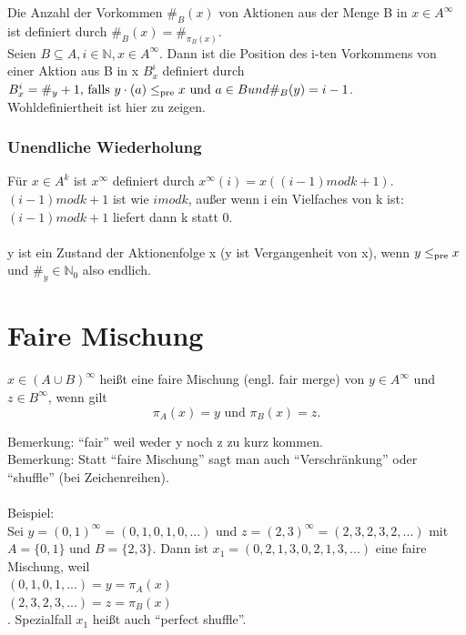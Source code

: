 Die Anzahl der Vorkommen $\#_B(x)$ von Aktionen aus der Menge B in $x \in A^{\infty}$ ist definiert durch $\#_B(x) = \#_{\pi_B(x)}$.
\\
Seien $B \subseteq A, i \in \mathbb{N}, x \in A^{\infty}$. Dann ist die Position des i-ten Vorkommens von einer Aktion aus B in x \emph{$B^i_x$} definiert durch $B^i_x = \#_y + 1 \text{, falls } y \cdot (a) \leq_{\operatorname{pre}} x \text{ und } a \in B und \#_B(y) = i - 1$.\\
Wohldefiniertheit ist hier zu zeigen.\\

\subsubsection*{Unendliche Wiederholung}
Für $x \in A^k$ ist \emph{$x^{\infty}$} definiert durch $x^{\infty}(i) = x((i - 1) mod k + 1)$.\\
$(i - 1) mod k + 1$ ist wie $i mod k$, außer wenn i ein Vielfaches von k ist:\\
$(i - 1) mod k + 1$ liefert dann k statt 0.\\
\\
y ist ein Zustand der Aktionenfolge x (y ist Vergangenheit von x), wenn $y \leq_{\operatorname{pre}} x$ und $\#_y \in \mathbb{N}_0$ also endlich.

\section{Faire Mischung}
$x \in (A \cup B)^\infty$ heißt eine faire Mischung (engl. fair merge) von $y \in A^\infty$ und $z \in B^\infty$, wenn gilt
\begin{equation*}
\pi_A(x) = y \text{ und } \pi_B(x) = z.
\end{equation*}

Bemerkung: "`fair"' weil weder y noch z zu kurz kommen.\\
Bemerkung: Statt "`faire Mischung"' sagt man auch "`Verschränkung"' oder "`shuffle"' (bei Zeichenreihen).\\
\\
Beispiel:\\
Sei $y = (0, 1)^\infty = (0, 1, 0, 1, 0, ...)$ und $z = (2,3)^\infty = (2, 3, 2, 3, 2, ...)$ mit $A = \{0, 1\}$ und $B = \{2, 3\}$. Dann ist $x_1 = (0, 2, 1, 3, 0, 2, 1, 3, ...)$ eine faire Mischung, weil \\
$(0,  1,  0,  1, ...) = y = \pi_A(x)$\\
$(2, 3, 2, 3, ...) = z = \pi_B(x)$\\.
Spezialfall $x_1$ heißt auch "`perfect shuffle"'.\\

